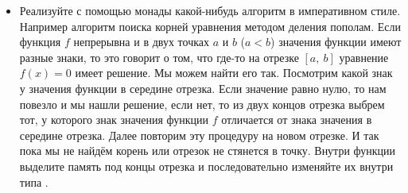 \begin{itemize}
\item Реализуйте с помощью монады  
какой-нибудь алгоритм в императивном стиле. 
Например алгоритм поиска корней уравнения методом деления 
пополам. Если функция $f$ непрерывна и в двух точках $a$ и $b$ ($a < b$)
значения функции имеют разные знаки, то это говорит о том,
что где-то на отрезке $[a,\ b]$ уравнение $f(x) = 0$ имеет решение.
Мы можем найти его так. Посмотрим какой знак у значения функции 
в середине отрезка. Если значение равно нулю, то нам повезло 
и мы нашли решение, если нет, то из двух концов отрезка выбрем тот, 
у которого знак значения функции $f$ отличается от знака значения в середине
отрезка. Далее повторим эту процедуру на новом отрезке. И так пока
мы не найдём корень или отрезок не стянется в точку.
Внутри функции выделите память под концы отрезка и последовательно
изменяйте их внутри типа .  
\end{itemize}







